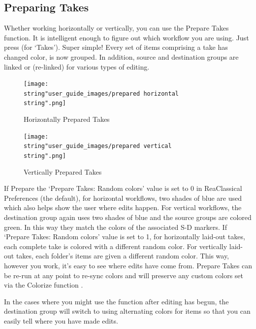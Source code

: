 \documentclass[10pt,american]{article}
\begin{document}
\subsection{Preparing Takes}

Whether working horizontally or vertically, you can use the Prepare Takes
function. It is intelligent enough to figure out which workflow you are using.
Just press  (for `Takes'). Super simple! Every set of items comprising a
take has changed color, is now grouped. In addition, source and destination
groups are linked or (re-linked) for various types of editing. 

\begin{figure}
\texttt{[image: \\string"user\_guide\_images/prepared horizontal\\string".png]}

\caption{Horizontally Prepared Takes}

\end{figure}

\begin{figure}
\texttt{[image: \\string"user\_guide\_images/prepared vertical\\string".png]}

\caption{Vertically Prepared Takes}

\end{figure}

If Prepare the `Prepare Takes: Random colors' value is set to 0 in ReaClassical
Preferences  (the default), for horizontal workflows, two shades of
blue are used which also helps show the user where edits happen. For vertical
workflows, the destination group again uses two shades of blue and the source
groups are colored green. In this way they match the colors of the associated
S-D markers. If `Prepare Takes: Random colors' value is set to 1, for
horizontally laid-out takes, each complete take is colored with a different
random color. For vertically laid-out takes, each folder's items are given a
different random color. This way, however you work, it's easy to see where edits
have come from. Prepare Takes can be re-run at any point to re-sync colors and
will preserve any custom colors set via the Colorize function .

In the cases where you might use the function after editing has begun, the
destination group will switch to using alternating colors for items so that you
can easily tell where you have made edits.
\end{document}
